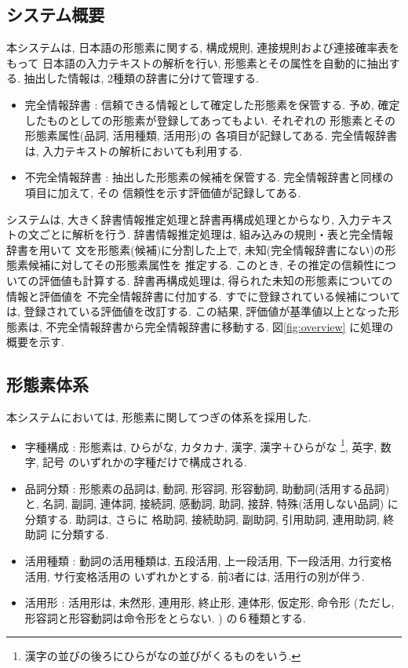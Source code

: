\subsection{システム概要}
\label{system_info}
本システムは, 日本語の形態素に関する, 構成規則, 連接規則および連接確率表をもって
日本語の入力テキストの解析を行い, 形態素とその属性を自動的に抽出する.  
抽出した情報は, 2種類の辞書に分けて管理する.  
\begin{itemize}
\item
完全情報辞書 : 
信頼できる情報として確定した形態素を保管する.  
予め, 確定したものとしての形態素が登録してあってもよい.  それぞれの
形態素とその形態素属性(品詞, 活用種類, 活用形)の
各項目が記録してある.  
完全情報辞書は, 入力テキストの解析においても利用する.  

\item
不完全情報辞書 : 
抽出した形態素の候補を保管する.  
完全情報辞書と同様の項目に加えて, その
信頼性を示す評価値が記録してある.  
\end{itemize}

システムは, 大きく辞書情報推定処理と辞書再構成処理とからなり, 
入力テキストの文ごとに解析を行う.  
辞書情報推定処理は, 組み込みの規則・表と完全情報辞書を用いて
文を形態素(候補)に分割した上で, 
未知(完全情報辞書にない)の形態素候補に対してその形態素属性を
推定する.  このとき, その推定の信頼性についての評価値も計算する.  
辞書再構成処理は, 得られた未知の形態素についての情報と評価値を
不完全情報辞書に付加する.  
すでに登録されている候補については, 登録されている評価値を改訂する.  
この結果, 評価値が基準値以上となった形態素は, 
不完全情報辞書から完全情報辞書に移動する.  
  図\ref{fig:overview} に処理の概要を示す. 

\begin{figure*}[tb]
 \caption{処理の概要}
 \label{fig:overview}
\end{figure*}
\subsection{形態素体系}
\label{morpheme_taikei}
本システムにおいては, 形態素に関してつぎの体系を採用した.  

\begin{itemize}
\item
字種構成 :
形態素は,  
ひらがな, カタカナ, 漢字, 
漢字＋ひらがな
\footnote{
漢字の並びの後ろにひらがなの並びがくるものをいう. 
}, 
英字, 数字, 記号
のいずれかの字種だけで構成される.  
\item
品詞分類 :
形態素の品詞は, 
動詞, 形容詞, 形容動詞, 助動詞(活用する品詞)と, 
名詞, 副詞, 連体詞, 接続詞, 感動詞, 助詞,  接辞, 特殊(活用しない品詞)
に分類する.  助詞は, さらに
格助詞, 接続助詞, 副助詞, 引用助詞, 連用助詞, 終助詞
に分類する.  
\item
活用種類 :
動詞の活用種類は, 
五段活用, 上一段活用, 下一段活用, カ行変格活用, サ行変格活用の
いずれかとする.  前3者には, 活用行の別が伴う.  
\item
活用形 :
活用形は,  
未然形, 連用形, 終止形, 連体形, 仮定形, 命令形
(ただし, 形容詞と形容動詞は命令形をとらない.  )
の６種類とする.  
\end{itemize}

